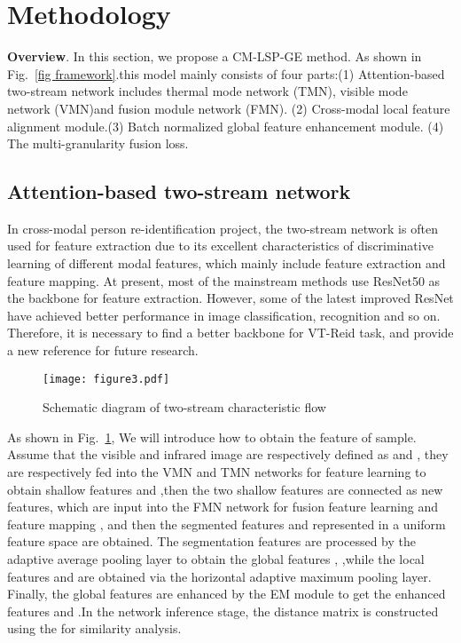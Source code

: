 \documentclass[journal]{IEEEtran}
\begin{document}
\section{Methodology}
\label{section3}
\textbf{Overview}. In this section, we propose a CM-LSP-GE method. As shown in Fig.~\ref{fig framework}.this model mainly consists of four parts:(1) Attention-based two-stream network includes thermal mode network (TMN), visible mode network (VMN)and fusion module network (FMN). (2) Cross-modal local feature alignment module.(3) Batch normalized global feature enhancement module. (4) The multi-granularity fusion loss.	

\subsection{Attention-based two-stream network}
\label{sec:basic}
In cross-modal person re-identification project, the two-stream network is often used for feature extraction due to its excellent characteristics of discriminative learning of different modal features, 
which mainly include feature extraction and feature mapping. At present, most of the mainstream methods use ResNet50 as the backbone for feature extraction. However, some of the latest improved ResNet have achieved better performance in image classification, recognition and so on. Therefore, it is necessary to find a better backbone for VT-Reid task, and provide a new reference for future research.
\vspace{-0.8cm}
\begin{figure}[ht]
	\centering
	\texttt{[image: figure3.pdf]}	
	
	\caption{Schematic diagram of two-stream characteristic flow}
	\label{fig3}
\vspace{-.05in}
\end{figure}

As shown in Fig.~\ref{fig3}, We will introduce how to obtain the feature of sample. Assume that the visible and infrared image are respectively defined as  and , they are respectively fed into the VMN and TMN networks for feature learning to obtain shallow features  and ,then the two shallow features are connected as new features, which are input into the FMN network for fusion feature learning and feature mapping , and then the segmented features  and  represented in a uniform feature space are obtained. The segmentation features are processed by the adaptive average pooling layer to obtain the global features , ,while the local features and are obtained via the horizontal adaptive maximum pooling layer. Finally, the global features are enhanced by the EM module to get the enhanced features and .In the network inference stage, the distance matrix is constructed using the  for similarity analysis.
\end{document}

